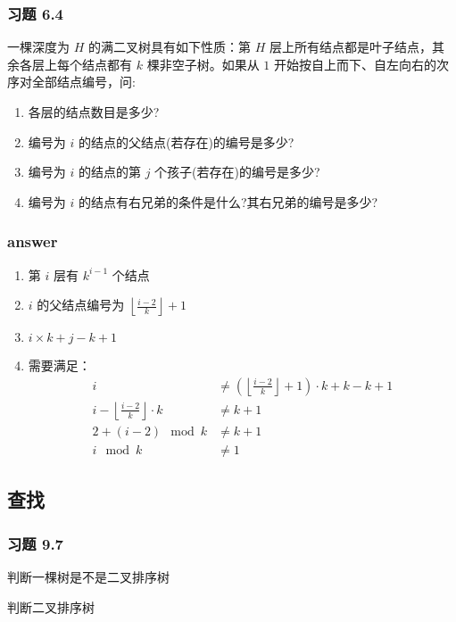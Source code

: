 \documentclass{beamer}
\begin{document}
    \begin{frame}
        \frametitle{习题 6.4}
        一棵深度为 $H$ 的满二叉树具有如下性质：第 $H$ 层上所有结点都是叶子结点，其 余各层上每个结点都有 $k$ 棵非空子树。如果从 $1$ 开始按自上而下、自左向右的次序对全部结点编号，问:
        \begin{enumerate}
            \item 各层的结点数目是多少?
            \item 编号为 $i$ 的结点的父结点(若存在)的编号是多少?
            \item 编号为 $i$ 的结点的第 $j$ 个孩子(若存在)的编号是多少?
            \item 编号为 $i$ 的结点有右兄弟的条件是什么?其右兄弟的编号是多少?
        \end{enumerate}
    \end{frame}

    \begin{frame}
        \frametitle{answer}
        \begin{enumerate}
            \item 第 $i$ 层有 $k^{i-1}$ 个结点
            \item $i$ 的父结点编号为 $\left\lfloor \frac{i-2}{k} \right\rfloor + 1$
            \item $i \times k + j - k + 1$
            \item 需要满足：\begin{align}
                i & \neq \left(\left\lfloor \frac{i-2}{k}\right\rfloor+1\right) \cdot k + k - k + 1 \\
                i -\left\lfloor \frac{i-2}{k}\right\rfloor \cdot k & \neq k + 1 \\
                2 + (i-2) \mod k & \neq k + 1 \\
                i \mod k & \neq 1
            \end{align}
        \end{enumerate}
    \end{frame}

    \subsection{查找}
    \begin{frame}
        \frametitle{习题 9.7}
        判断一棵树是不是二叉排序树
        \begin{algorithm}[H]
            \caption{判断二叉排序树}
        \end{algorithm}
    \end{frame}
\end{document}
